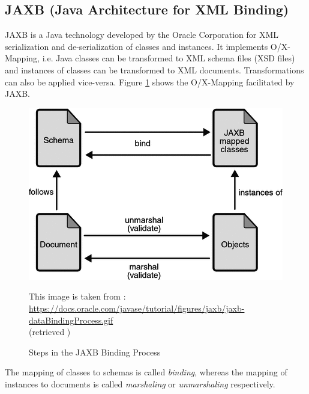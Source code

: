 \subsection{JAXB (Java Architecture for XML Binding)}
\label{subsection:JAXB}
\Gls{JAXB} \cite{JAXB} \cite{JAXBTutorial}
is a \gls{Java} technology developed by the Oracle Corporation for \gls{XML} serialization and de-serialization of classes and instances.
It implements \gls{O/X-Mapping}, i.e. \gls{Java} classes can be transformed to \gls{XML} schema files (\gls{XSD} files) and instances of classes can be transformed to \gls{XML} documents.
Transformations can also be applied vice-versa.
Figure \ref{figure:JAXBDataBindingProcess} shows the \gls{O/X-Mapping} facilitated by \gls{JAXB}.
\begin{figure}[h!]
\begin{center}
\includegraphics[width=\textwidth]{images/jaxb-dataBindingProcess_gray.png}
\end{center}
{
\scriptsize
\begin{center}
This image is taken from \cite{jaxbDataBindingProcess}:\\
\url{https://docs.oracle.com/javase/tutorial/figures/jaxb/jaxb-dataBindingProcess.gif}\\
(retrieved )
\end{center}
}
\caption{Steps in the JAXB Binding Process}
\label{figure:JAXBDataBindingProcess}
\end{figure}
The mapping of classes to schemas is called \textit{binding}, whereas the mapping of instances to documents is called \textit{marshaling} or \textit{unmarshaling} respectively.

